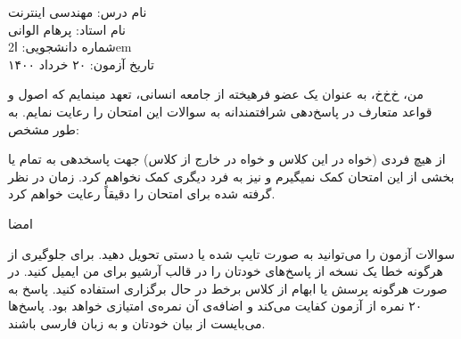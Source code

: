 \documentclass[../main.tex]{subfiles}
\begin{document}
نام درس:‌ مهندسی اینترنت\\
نام استاد:‌ پرهام الوانی\\
شماره دانشجویی:‌ ‌ا{2em}\\
تاریخ آزمون: ۲۰ خرداد ۱۴۰۰

من، ‌خ‌خ‌خ، به عنوان یک عضو فرهیخته از جامعه انسانی،
تعهد مینمایم که اصول و قواعد متعارف در پاسخ‌دهی
شرافتمندانه به سوالات این امتحان را رعایت نمایم. به طور مشخص:

     از هیچ فردی (خواه در این کلاس و خواه در خارج از کلاس) جهت پاسخدهی به تمام یا بخشی از
    این امتحان کمک نمیگیرم و نیز به فرد دیگری کمک نخواهم کرد.
     زمان در نظر گرفته شده برای امتحان را دقیقاً رعایت خواهم کرد.

امضا

     سوالات آزمون را می‌توانید به صورت تایپ شده یا دستی تحویل دهید.
     برای جلوگیری از هرگونه خطا یک نسخه از پاسخ‌های خودتان را در قالب آرشیو برای من ایمیل کنید.
     در صورت هرگونه پرسش یا ابهام از کلاس برخط در حال برگزاری استفاده کنید.
     پاسخ به ۲۰ نمره از آزمون کفایت می‌کند و اضافه‌ی آن نمره‌ی امتیازی خواهد بود.
     پاسخ‌ها می‌بایست از بیان خودتان و به زبان فارسی باشند.
\end{document}

